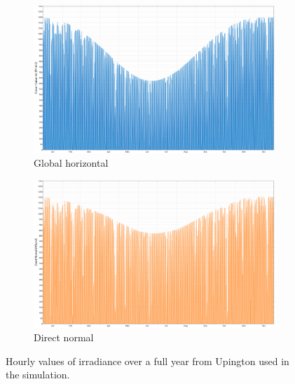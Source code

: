 \documentclass[Master,MEE,english]{twbook}%
\begin{document}
\begin{figure}[!htbp]
        \centering
                \begin{subfigure}[b]{1\textwidth}
                \centering
                \includegraphics[width=1\textwidth]{FIG/Upington_GHI}
                \caption{Global horizontal}\label{Upington_GHI}
        \end{subfigure}%
\par\medskip %
        \begin{subfigure}[b]{1\textwidth}
                \centering
                \includegraphics[width=1\textwidth]{FIG/Upington_DNI}
                \caption{Direct normal }\label{Upington_DNI}
        \end{subfigure}%

        \caption[Hourly values of irradiance over a full year from Upington used in the simulation.]{Hourly values of irradiance over a full year from Upington used in the simulation.}\label{Upington_GHI/DNI}
\end{figure}
\end{document}
